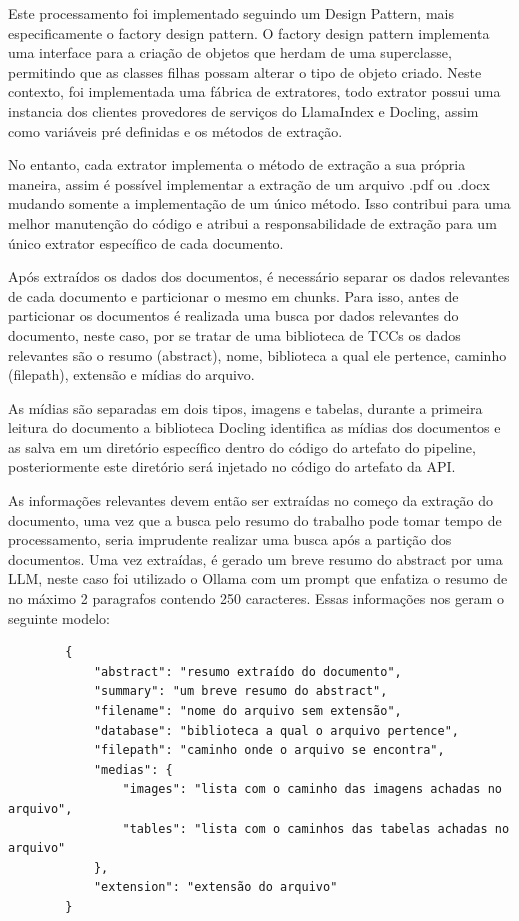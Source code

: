 \documentclass[a4paper, 12pt]{article}
\begin{document}
    Este processamento foi implementado seguindo um Design Pattern, mais especificamente o factory design pattern. O factory design pattern implementa uma interface para a criação de objetos que herdam de uma superclasse, permitindo que as classes filhas possam alterar o tipo de objeto criado. Neste contexto, foi implementada uma fábrica de extratores, todo extrator possui uma instancia dos clientes provedores de serviços do LlamaIndex e Docling, assim como variáveis pré definidas e os métodos de extração.
    
    No entanto, cada extrator implementa o método de extração a sua própria maneira, assim é possível implementar a extração de um arquivo .pdf ou .docx mudando somente a implementação de um único método. Isso contribui para uma melhor manutenção do código e atribui a responsabilidade de extração para um único extrator específico de cada documento.

    Após extraídos os dados dos documentos, é necessário separar os dados relevantes de cada documento e particionar o mesmo em chunks. Para isso, antes de particionar os documentos é realizada uma busca por dados relevantes do documento, neste caso, por se tratar de uma biblioteca de TCCs os dados relevantes são o resumo (abstract), nome, biblioteca a qual ele pertence, caminho (filepath), extensão e mídias do arquivo.

    As mídias são separadas em dois tipos, imagens e tabelas, durante a primeira leitura do documento a biblioteca Docling identifica as mídias dos documentos e as salva em um diretório específico dentro do código do artefato do pipeline, posteriormente este diretório será injetado no código do artefato da API.

    As informações relevantes devem então ser extraídas no começo da extração do documento, uma vez que a busca pelo resumo do trabalho pode tomar tempo de processamento, seria imprudente realizar uma busca após a partição dos documentos. Uma vez extraídas, é gerado um breve resumo do abstract por uma LLM, neste caso foi utilizado o Ollama com um prompt que enfatiza o resumo de no máximo 2 paragrafos contendo 250 caracteres. Essas informações nos geram o seguinte modelo:

    \begin{lstlisting}
        {
            "abstract": "resumo extraído do documento",
            "summary": "um breve resumo do abstract",
            "filename": "nome do arquivo sem extensão",
            "database": "biblioteca a qual o arquivo pertence",
            "filepath": "caminho onde o arquivo se encontra",
            "medias": {
                "images": "lista com o caminho das imagens achadas no arquivo",
                "tables": "lista com o caminhos das tabelas achadas no arquivo"
            },
            "extension": "extensão do arquivo"
        }
    \end{lstlisting}
\end{document}
